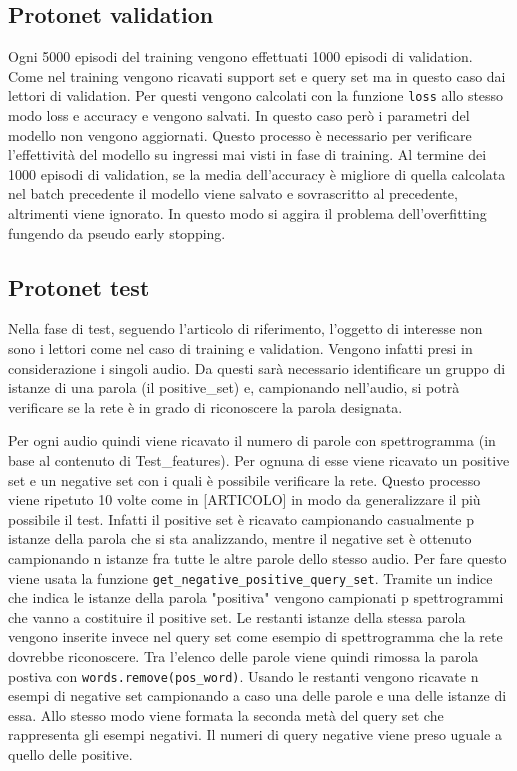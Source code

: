 \documentclass[12pt,a4paper,titlepage]{article}
\begin{document}
\subsection{Protonet validation}
Ogni 5000 episodi del training vengono effettuati 1000 episodi di validation.
Come nel training vengono ricavati support set e query set ma in questo caso dai lettori di validation.
Per questi vengono calcolati con la funzione \texttt{loss} allo stesso modo loss e accuracy e vengono salvati.
In questo caso però i parametri del modello non vengono aggiornati.
Questo processo è necessario per verificare l'effettività del modello su ingressi mai visti in fase di training.
Al termine dei 1000 episodi di validation, se la media dell'accuracy è migliore di quella calcolata nel batch precedente il modello viene salvato e sovrascritto al precedente, altrimenti viene ignorato.
In questo modo si aggira il problema dell'overfitting fungendo da pseudo early stopping. 
\subsection{Protonet test}
Nella fase di test, seguendo l'articolo di riferimento, l'oggetto di interesse non sono i lettori come nel caso di training e validation. Vengono infatti presi in considerazione i singoli audio. Da questi sarà necessario identificare un gruppo di istanze di una parola (il positive\_set) e, campionando nell'audio, si potrà verificare se la rete è in grado di riconoscere la parola designata.


Per ogni audio quindi viene ricavato il numero di parole con spettrogramma (in base al contenuto di Test\_features).
Per ognuna di esse viene ricavato un positive set e un negative set con i quali è possibile verificare la rete.
Questo processo viene ripetuto 10 volte come in [ARTICOLO] in modo da generalizzare il più possibile il test.
Infatti il positive set è  ricavato campionando casualmente p istanze della parola che si sta analizzando, mentre il negative set è ottenuto campionando n istanze fra tutte le altre parole dello stesso audio.
Per fare questo viene usata la funzione \texttt{get\_negative\_positive\_query\_set}.
Tramite un indice che indica le istanze della parola "positiva" vengono campionati p spettrogrammi che vanno a costituire il positive set. Le restanti istanze della stessa parola vengono inserite invece nel query set come esempio di spettrogramma che la rete dovrebbe riconoscere.
Tra l'elenco delle parole viene quindi rimossa la parola postiva con \texttt{words.remove(pos\_word)}.
Usando le restanti vengono ricavate n esempi di negative set campionando a caso una delle parole e una delle istanze di essa.
Allo stesso modo viene formata la seconda metà del query set che rappresenta gli esempi negativi. Il numeri di query negative viene preso uguale a quello delle positive.
\end{document}
